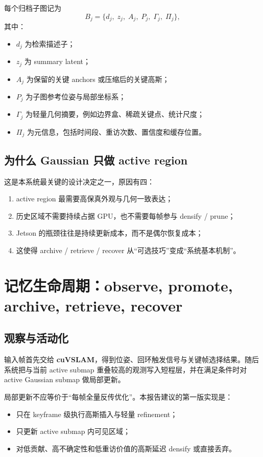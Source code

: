 \documentclass[12pt]{article}
\newcommand{\cuvslam}{\textbf{cuVSLAM}}
\begin{document}
每个归档子图记为
\begin{equation}
B_j = \{d_j,\; z_j,\; A_j,\; P_j,\; \Gamma_j,\; \Pi_j\},
\end{equation}
其中：
\begin{itemize}
  \item $d_j$ 为检索描述子；
  \item $z_j$ 为 summary latent；
  \item $A_j$ 为保留的关键 anchors 或压缩后的关键高斯；
  \item $P_j$ 为子图参考位姿与局部坐标系；
  \item $\Gamma_j$ 为轻量几何摘要，例如边界盒、稀疏关键点、统计尺度；
  \item $\Pi_j$ 为元信息，包括时间段、重访次数、置信度和缓存位置。
\end{itemize}

\subsection{为什么 Gaussian 只做 active region}

这是本系统最关键的设计决定之一，原因有四：
\begin{enumerate}
  \item active region 最需要高保真外观与几何一致表达；
  \item 历史区域不需要持续占据 GPU，也不需要每帧参与 densify / prune；
  \item Jetson 的瓶颈往往是持续更新成本，而不是偶尔恢复成本；
  \item 这使得 archive / retrieve / recover 从“可选技巧”变成“系统基本机制”。
\end{enumerate}

\section{记忆生命周期：observe, promote, archive, retrieve, recover}

\subsection{观察与活动化}

输入帧首先交给 \cuvslam{}，得到位姿、回环触发信号与关键帧选择结果。随后系统把与当前 active submap 重叠较高的观测写入短程层，并在满足条件时对 active Gaussian submap 做局部更新。

局部更新不应等价于“每帧全量反传优化”。本报告建议的第一版实现是：
\begin{itemize}
  \item 只在 keyframe 级执行高斯插入与轻量 refinement；
  \item 只更新 active submap 内可见区域；
  \item 对低贡献、高不确定性和低重访价值的高斯延迟 densify 或直接丢弃。
\end{itemize}
\end{document}
